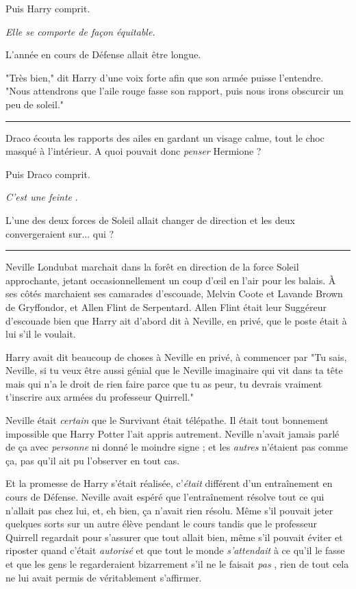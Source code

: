 Puis Harry comprit.

\emph{Elle se comporte de façon équitable.} 

L'année en cours de Défense allait être longue.

"Très bien," dit Harry d'une voix forte afin que son armée puisse l'entendre. "Nous attendrons que l'aile rouge fasse son rapport, puis nous irons obscurcir un peu de soleil."
\par\noindent\rule{\textwidth}{0.4pt}
Draco écouta les rapports des ailes en gardant un visage calme, tout le choc masqué à l'intérieur. A quoi pouvait donc \emph{penser}  Hermione ?

Puis Draco comprit.

\emph{C'est une feinte} .

L'une des deux forces de Soleil allait changer de direction et les deux convergeraient sur... qui ?
\par\noindent\rule{\textwidth}{0.4pt}
Neville Londubat marchait dans la forêt en direction de la force Soleil approchante, jetant occasionnellement un coup d'œil en l'air pour les balais. À ses côtés marchaient ses camarades d'escouade, Melvin Coote et Lavande Brown de Gryffondor, et Allen Flint de Serpentard. Allen Flint était leur Suggéreur d'escouade bien que Harry ait d'abord dit à Neville, en privé, que le poste était à lui s'il le voulait.

Harry avait dit beaucoup de choses à Neville en privé, à commencer par "Tu sais, Neville, si tu veux être aussi génial que le Neville imaginaire qui vit dans ta tête mais qui n'a le droit de rien faire parce que tu as peur, tu devrais vraiment t'inscrire aux armées du professeur Quirrell."

Neville était \emph{certain}  que le Survivant était télépathe. Il était tout bonnement impossible que Harry Potter l'ait appris autrement. Neville n'avait jamais parlé de ça avec \emph{personne } ni donné le moindre signe ; et les \emph{autres}  n'étaient pas comme ça, pas qu'il ait pu l'observer en tout cas.

Et la promesse de Harry s'était réalisée, c'\emph{était}  différent d'un entraînement en cours de Défense. Neville avait espéré que l'entraînement résolve tout ce qui n'allait pas chez lui, et, eh bien, ça n'avait rien résolu. Même s'il pouvait jeter quelques sorts sur un autre élève pendant le cours tandis que le professeur Quirrell regardait pour s'assurer que tout allait bien, même s'il pouvait éviter et riposter quand c'était \emph{autorisé}  et que tout le monde \emph{s'attendait}  à ce qu'il le fasse et que les gens le regarderaient bizarrement s'il ne le faisait \emph{pas} , rien de tout cela ne lui avait permis de véritablement s'affirmer.

